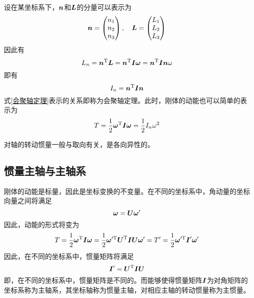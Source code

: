 设在某坐标系下，$\boldsymbol{n}$和$\boldsymbol{L}$的分量可以表示为
\begin{equation*}
	\boldsymbol{n} = \begin{pmatrix} n_1 \\ n_2 \\ n_3 \end{pmatrix},\quad \boldsymbol{L} = \begin{pmatrix} L_1 \\ L_2 \\ L_3 \end{pmatrix}
\end{equation*}
因此有
\begin{equation*}
	L_n = \boldsymbol{n}^{\mathrm{T}} \boldsymbol{L} = \boldsymbol{n}^{\mathrm{T}} \boldsymbol{I} \boldsymbol{\omega} = \boldsymbol{n}^{\mathrm{T}} \boldsymbol{I} \boldsymbol{n} \omega
\end{equation*}
即有
\begin{equation}
	I_n = \boldsymbol{n}^{\mathrm{T}} \boldsymbol{I} \boldsymbol{n}
	\label{会聚轴定理}
\end{equation}
式\eqref{会聚轴定理}表示的关系即称为{\heiti 会聚轴定理}。此时，刚体的动能也可以简单的表示为
\begin{equation}
	T = \frac12 \boldsymbol{\omega}^{\mathrm{T}} \boldsymbol{I} \boldsymbol{\omega} = \frac12 I_n \omega^2
\end{equation}

对轴的转动惯量一般与取向有关，是各向异性的。

\subsection{惯量主轴与主轴系}\label{chapter6:subsection-惯量主轴与主轴系}

刚体的动能是标量，因此是坐标变换的不变量。在不同的坐标系中，角动量的坐标向量之间将满足
\begin{equation*}
	\boldsymbol{\omega} = \boldsymbol{U} \boldsymbol{\omega}'
\end{equation*}
因此，动能的形式将变为
\begin{equation*}
	T = \frac12 \boldsymbol{\omega}^{\mathrm{T}} \boldsymbol{I} \boldsymbol{\omega} = \frac12 \boldsymbol{\omega}'^{\mathrm{T}} \boldsymbol{U}^{\mathrm{T}} \boldsymbol{I} \boldsymbol{U} \boldsymbol{\omega}' = T' = \frac12 \boldsymbol{\omega}'^{\mathrm{T}} \boldsymbol{I}' \boldsymbol{\omega}'
\end{equation*}
因此，在不同的坐标系中，惯量矩阵将满足
\begin{equation*}
	\boldsymbol{I}' = \boldsymbol{U}^{\mathrm{T}} \boldsymbol{I} \boldsymbol{U}
\end{equation*}
即，在不同的坐标系中，惯量矩阵是不同的。而能够使得惯量矩阵$\boldsymbol{I}$为对角矩阵的坐标系称为{\heiti 主轴系}，其坐标轴称为{\heiti 惯量主轴}，对相应主轴的转动惯量称为{\heiti 主惯量}。

